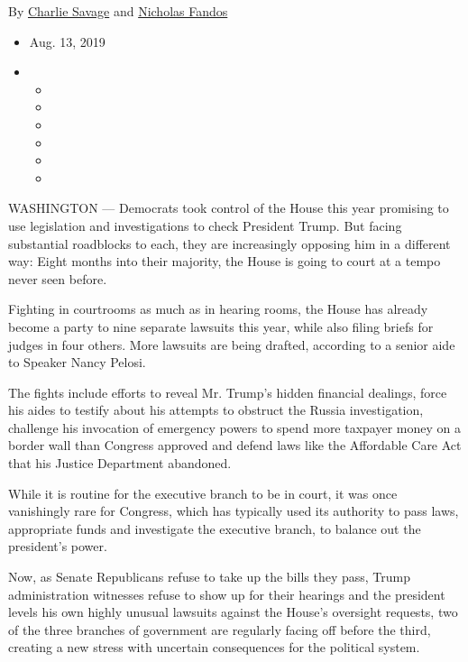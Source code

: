 By \href{https://www.nytimes3xbfgragh.onion/by/charlie-savage}{Charlie
Savage} and
\href{https://www.nytimes3xbfgragh.onion/by/nicholas-fandos}{Nicholas
Fandos}

\begin{itemize}
\item
  Aug. 13, 2019
\item
  \begin{itemize}
  \item
  \item
  \item
  \item
  \item
  \item
  \end{itemize}
\end{itemize}

WASHINGTON --- Democrats took control of the House this year promising
to use legislation and investigations to check President Trump. But
facing substantial roadblocks to each, they are increasingly opposing
him in a different way: Eight months into their majority, the House is
going to court at a tempo never seen before.

Fighting in courtrooms as much as in hearing rooms, the House has
already become a party to nine separate lawsuits this year, while also
filing briefs for judges in four others. More lawsuits are being
drafted, according to a senior aide to Speaker Nancy Pelosi.

The fights include efforts to reveal Mr. Trump's hidden financial
dealings, force his aides to testify about his attempts to obstruct the
Russia investigation, challenge his invocation of emergency powers to
spend more taxpayer money on a border wall than Congress approved and
defend laws like the Affordable Care Act that his Justice Department
abandoned.

While it is routine for the executive branch to be in court, it was once
vanishingly rare for Congress, which has typically used its authority to
pass laws, appropriate funds and investigate the executive branch, to
balance out the president's power.

Now, as Senate Republicans refuse to take up the bills they pass, Trump
administration witnesses refuse to show up for their hearings and the
president levels his own highly unusual lawsuits against the House's
oversight requests, two of the three branches of government are
regularly facing off before the third, creating a new stress with
uncertain consequences for the political system.

